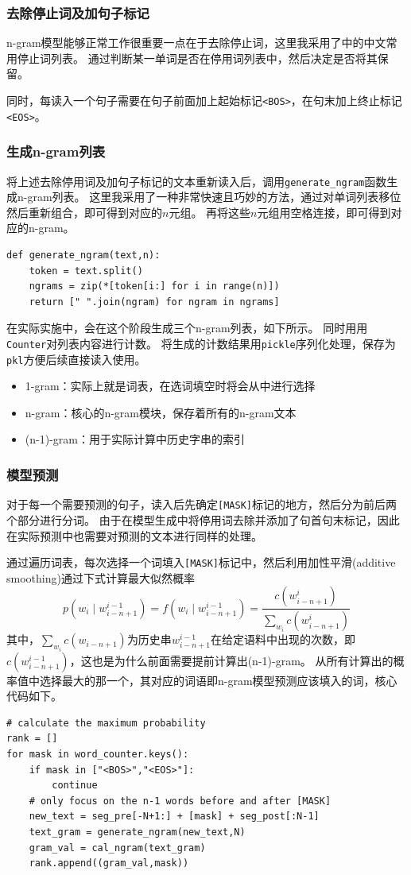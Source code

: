 \documentclass[logo,reportComp]{thesis}
\begin{document}
\subsubsection{去除停止词及加句子标记}
n-gram模型能够正常工作很重要一点在于去除停止词，这里我采用了\cite{bib:stopword}中的中文常用停止词列表。
通过判断某一单词是否在停用词列表中，然后决定是否将其保留。

同时，每读入一个句子需要在句子前面加上起始标记\verb'<BOS>'，在句末加上终止标记\verb'<EOS>'。

\subsubsection{生成n-gram列表}
将上述去除停用词及加句子标记的文本重新读入后，调用\verb'generate_ngram'函数生成n-gram列表。
这里我采用了一种非常快速且巧妙的方法，通过对单词列表移位然后重新组合，即可得到对应的$n$元组。
再将这些$n$元组用空格连接，即可得到对应的n-gram。
\begin{lstlisting}
def generate_ngram(text,n):
    token = text.split()
    ngrams = zip(*[token[i:] for i in range(n)])
    return [" ".join(ngram) for ngram in ngrams]
\end{lstlisting}

在实际实施中，会在这个阶段生成三个n-gram列表，如下所示。
同时用用\verb'Counter'对列表内容进行计数。
将生成的计数结果用\verb'pickle'序列化处理，保存为\verb'pkl'方便后续直接读入使用。
\begin{itemize}
    \item 1-gram：实际上就是词表，在选词填空时将会从中进行选择
    \item n-gram：核心的n-gram模块，保存着所有的n-gram文本
    \item (n-1)-gram：用于实际计算中历史字串的索引
\end{itemize}

\subsubsection{模型预测}
对于每一个需要预测的句子，读入后先确定\verb'[MASK]'标记的地方，然后分为前后两个部分进行分词。
由于在模型生成中将停用词去除并添加了句首句末标记，因此在实际预测中也需要对预测的文本进行同样的处理。

通过遍历词表，每次选择一个词填入\verb'[MASK]'标记中，然后利用加性平滑(additive smoothing)通过下式计算最大似然概率
\[p(w_i\mid w_{i-n+1}^{i-1})=f(w_i\mid w_{i-n+1}^{i-1})=\frac{c(w_{i-n+1}^i)}{\sum_{w_i}c(w_{i-n+1}^i)}\]
其中，$\sum_{w_i}c(w_{i-n+1})$为历史串$w_{i-n+1}^{i-1}$在给定语料中出现的次数，即$c(w_{i-n+1}^{i-1})$，这也是为什么前面需要提前计算出(n-1)-gram。
从所有计算出的概率值中选择最大的那一个，其对应的词语即n-gram模型预测应该填入的词，核心代码如下。
\begin{lstlisting}
# calculate the maximum probability
rank = []
for mask in word_counter.keys():
    if mask in ["<BOS>","<EOS>"]:
        continue
    # only focus on the n-1 words before and after [MASK]
    new_text = seg_pre[-N+1:] + [mask] + seg_post[:N-1]
    text_gram = generate_ngram(new_text,N)
    gram_val = cal_ngram(text_gram)
    rank.append((gram_val,mask))
\end{lstlisting}
\end{document}
